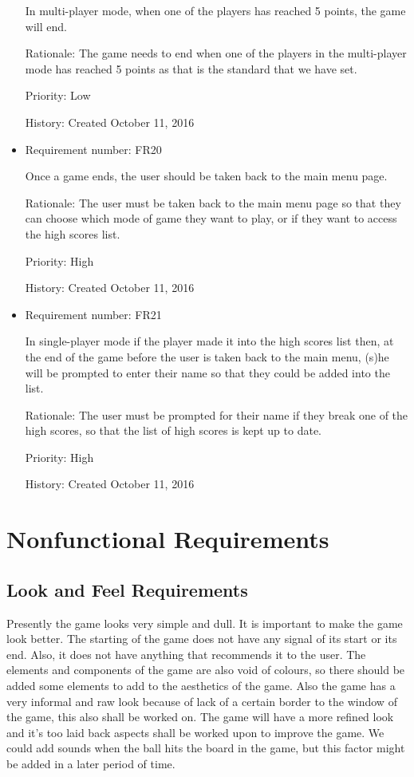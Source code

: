 \documentclass[12pt,letterpaper]{article}
\begin{document}
\begin{itemize}
		In multi-player mode, when one of the players has reached 5 points, the game will end.

		Rationale: The game needs to end when one of the players in the multi-player mode has reached 5 points as that is the standard that we have set.

		Priority: Low

		History: Created October 11, 2016

		\item Requirement number: FR20
	
		Once a game ends, the user should be taken back to the main menu page.

		Rationale: The user must be taken back to the main menu page so that they can choose which mode of game they want to play, or if they want to access the high scores list.

		Priority: High

		History: Created October 11, 2016

		\item Requirement number: FR21

		In single-player mode if the player made it into the high scores list then, at the end of the game before the user is taken back to the main menu, (s)he will be prompted to enter their name so that they could be added into the list.

		Rationale: The user must be prompted for their name if they break one of the high scores, so that the list of high scores is kept up to date.

		Priority: High

		History: Created October 11, 2016

		
		
	\end{itemize}
	\section{Nonfunctional Requirements}
	\subsection{Look and Feel Requirements}
	Presently the game looks very simple and dull. It is important to make the game look better. The starting of the game does not have any signal of its start or its end. Also, it does not have anything that recommends it to the user. The elements and components of the game are also void of colours, so there should be added some elements to add to the aesthetics of the game. Also the game has a very informal and raw look because of lack of a certain border to the window of the game, this also shall be worked on. The game will have a more refined look and it’s too laid back aspects shall be worked upon to improve the game. We could add sounds when the ball hits the board in the game, but this factor might be added in a later period of time.
\end{document}
